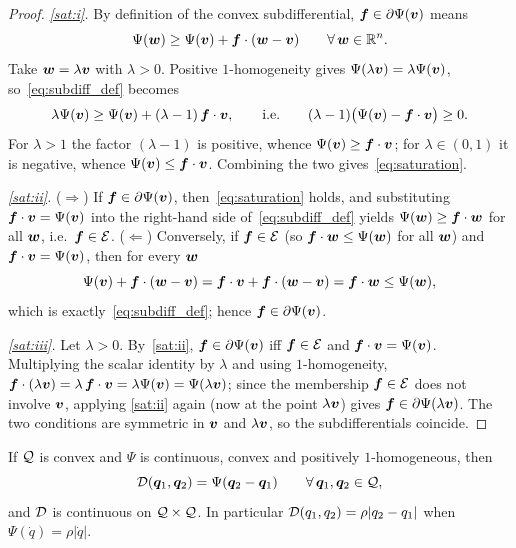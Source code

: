 \begin{proof}
\emph{\ref{sat:i}.} By definition of the convex subdifferential,
$\bm{f}\in\partial\Psi(\bm{v})$ means
\begin{equation}\label{eq:subdiff_def}
  \Psi(\bm{w})\ge\Psi(\bm{v})+\bm{f}\cdot(\bm{w}-\bm{v})
  \qquad\forall\,\bm{w}\in\mathbb{R}^n .
\end{equation}
Take $\bm{w}=\lambda\bm{v}$ with $\lambda>0$. Positive $1$-homogeneity
gives $\Psi(\lambda\bm{v})=\lambda\Psi(\bm{v})$, so~\eqref{eq:subdiff_def}
becomes
\[
  \lambda\Psi(\bm{v})\ge\Psi(\bm{v})+(\lambda-1)\,\bm{f}\cdot\bm{v},
  \qquad\text{i.e.}\qquad
  (\lambda-1)\bigl(\Psi(\bm{v})-\bm{f}\cdot\bm{v}\bigr)\ge0 .
\]
For $\lambda>1$ the factor $(\lambda-1)$ is positive, whence
$\Psi(\bm{v})\ge\bm{f}\cdot\bm{v}$; for $\lambda\in(0,1)$ it is negative,
whence $\Psi(\bm{v})\le\bm{f}\cdot\bm{v}$. Combining the two
gives~\eqref{eq:saturation}.

\emph{\ref{sat:ii}.} ($\Rightarrow$) If $\bm{f}\in\partial\Psi(\bm{v})$,
then~\eqref{eq:saturation} holds, and substituting
$\bm{f}\cdot\bm{v}=\Psi(\bm{v})$ into the right-hand side
of~\eqref{eq:subdiff_def} yields $\Psi(\bm{w})\ge\bm{f}\cdot\bm{w}$ for all
$\bm{w}$, i.e.\ $\bm{f}\in\mathcal{E}$. ($\Leftarrow$) Conversely, if $\bm{f}\in\mathcal{E}$
(so $\bm{f}\cdot\bm{w}\le\Psi(\bm{w})$ for all $\bm{w}$) and
$\bm{f}\cdot\bm{v}=\Psi(\bm{v})$, then for every $\bm{w}$
\[
  \Psi(\bm{v})+\bm{f}\cdot(\bm{w}-\bm{v})
  =\bm{f}\cdot\bm{v}+\bm{f}\cdot(\bm{w}-\bm{v})
  =\bm{f}\cdot\bm{w}\le\Psi(\bm{w}),
\]
which is exactly~\eqref{eq:subdiff_def}; hence
$\bm{f}\in\partial\Psi(\bm{v})$.

\emph{\ref{sat:iii}.} Let $\lambda>0$. By~\ref{sat:ii},
$\bm{f}\in\partial\Psi(\bm{v})$ iff $\bm{f}\in\mathcal{E}$ and
$\bm{f}\cdot\bm{v}=\Psi(\bm{v})$. Multiplying the scalar identity by
$\lambda$ and using $1$-homogeneity,
$\bm{f}\cdot(\lambda\bm{v})=\lambda\,\bm{f}\cdot\bm{v}=\lambda\Psi(\bm{v})=\Psi(\lambda\bm{v})$;
since the membership $\bm{f}\in\mathcal{E}$ does not involve $\bm{v}$, applying
\ref{sat:ii} again (now at the point $\lambda\bm{v}$) gives
$\bm{f}\in\partial\Psi(\lambda\bm{v})$. The two conditions are symmetric
in $\bm{v}$ and $\lambda\bm{v}$, so the subdifferentials coincide.
\end{proof}

\begin{proposition}\label{prop:Dr_linear}
If $\mathcal{Q}$ is convex and $\Psi$ is continuous, convex and positively
$1$-homogeneous, then
\begin{equation}\label{eq:Dr_linear}
  \mathcal{D}(\bm{q}_1,\bm{q}_2)=\Psi(\bm{q}_2-\bm{q}_1)\qquad\forall\,\bm{q}_1,\bm{q}_2\in\mathcal{Q},
\end{equation}
and $\mathcal{D}$ is continuous on $\mathcal{Q}\times\mathcal{Q}$. In particular
$\mathcal{D}(q_1,q_2)=\rho|q_2-q_1|$ when $\Psi(\dot q)=\rho|\dot q|$.
\end{proposition}

